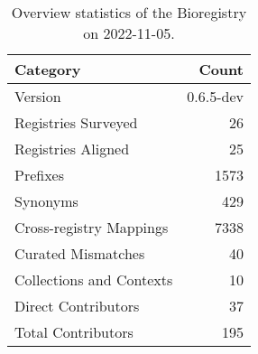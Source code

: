 \begin{table}
\centering
\caption{Overview statistics of the Bioregistry on 2022-11-05.}
\label{tab:bioregistry-summary}
\begin{tabular}{lr}
\toprule
                Category &     Count \\
\midrule
                 Version & 0.6.5-dev \\
     Registries Surveyed &        26 \\
      Registries Aligned &        25 \\
                Prefixes &      1573 \\
                Synonyms &       429 \\
 Cross-registry Mappings &      7338 \\
      Curated Mismatches &        40 \\
Collections and Contexts &        10 \\
     Direct Contributors &        37 \\
      Total Contributors &       195 \\
\bottomrule
\end{tabular}
\end{table}
